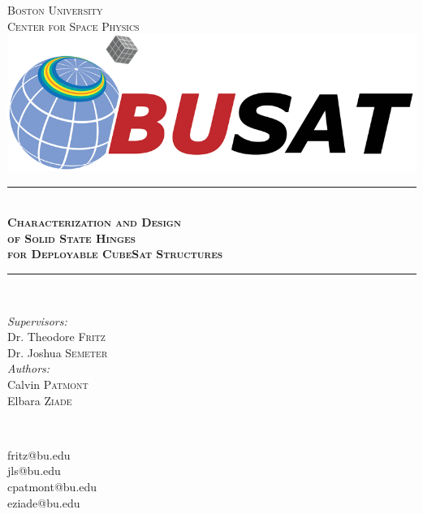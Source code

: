 
\begin{titlepage}

\newcommand{\HRule}{\rule{\linewidth}{0.5mm}} %

\center %
 

\textsc{\Huge Boston University}
\\[1.0cm]
\textsc{\huge Center for Space Physics}
\\[.5cm]
\includegraphics[width=.6\textwidth]{images/00_header-logo-BUSAT}
\\[.75cm]



\HRule \\[0.4cm]
\textsc{\huge \bf \huge Characterization and Design \\[.5cm]of Solid State Hinges \\[.5cm]for Deployable CubeSat Structures}
\\[0.4cm]
\HRule \\[.75cm]
 

\begin{minipage}{0.4\textwidth}
\begin{flushleft} \large
\emph{Supervisors:}
\\Dr. Theodore \textsc{Fritz} %
\\Dr. Joshua \textsc{Semeter} 
\\[.4cm]
\emph{Authors:}\\
Calvin  \textsc{Patmont} \\
Elbara \textsc{Ziade}
\end{flushleft}
\end{minipage}
~
\begin{minipage}{0.4\textwidth}
\begin{flushright} \large
 fritz@bu.edu\\
jls@bu.edu\\[1.cm]
cpatmont@bu.edu\\
eziade@bu.edu\\
\end{flushright}
\end{minipage}\\[.75cm]



\end{titlepage}
